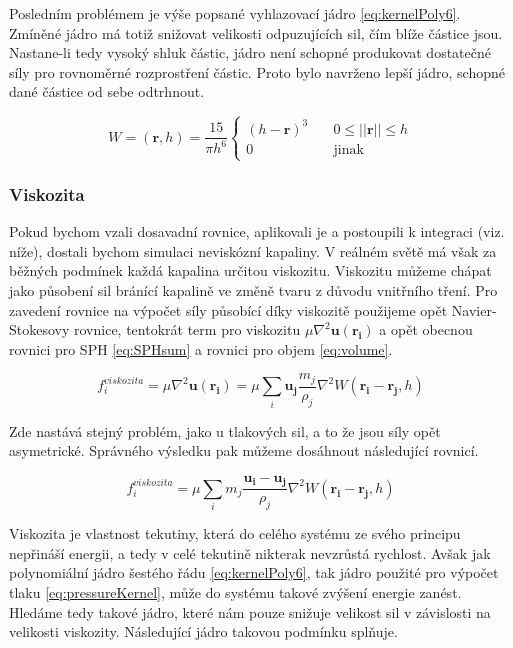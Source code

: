 Posledním problémem je výše popsané vyhlazovací jádro \ref{eq:kernelPoly6}. Zmíněné jádro má totiž snižovat velikosti odpuzujících sil, čím blíže částice jsou. Nastane-li tedy vysoký shluk částic, jádro není schopné produkovat dostatečné síly pro rovnoměrné rozprostření částic. Proto bylo navrženo \cite{Desbrun96} lepší jádro, schopné dané částice od sebe odtrhnout.

\begin{equation}
    W = (\mathbf{r}, h) = \frac{15}{\pi h^6} 
    \begin{cases}
      (h - \mathbf{r})^3 & \quad 0 \leq ||\mathbf{r}|| \leq h \\
      0 & \quad \text{jinak}
    \end{cases}
    \label{eq:pressureKernel}
\end{equation}
    
\subsubsection{Viskozita}
Pokud bychom vzali dosavadní rovnice, aplikovali je a postoupili k integraci (viz. níže), dostali bychom simulaci neviskózní kapaliny. V reálném světě má však za běžných podmínek každá kapalina určitou viskozitu. Viskozitu můžeme chápat jako působení sil bránící kapalině ve změně tvaru z důvodu vnitřního tření. Pro zavedení rovnice na výpočet síly působící díky viskozitě použijeme opět Navier-Stokesovy rovnice, tentokrát term pro viskozitu $\mu \nabla^2\mathbf{u}(\mathbf{r_i})$ a opět obecnou rovnici pro SPH \ref{eq:SPHsum} a rovnici pro objem \ref{eq:volume}.

\begin{equation}
    f^{viskozita}_i = \mu \nabla^2\mathbf{u}(\mathbf{r_i}) = \mu \sum_i \mathbf{u_j} \frac{m_j}{\rho_j} \nabla^2 W(\mathbf{r_i} - \mathbf{r_j},h)
\end{equation}

Zde nastává stejný problém, jako u tlakových sil, a to že jsou síly opět asymetrické. Správného výsledku pak můžeme dosáhnout následující rovnicí. \cite{Muller03}

\begin{equation}
    f^{viskozita}_i = \mu \sum_i m_j \frac{\mathbf{u_i} - \mathbf{u_j}}{\rho_j} \nabla^2 W(\mathbf{r_i} - \mathbf{r_j},h)
    \label{eq:ViscForce}
\end{equation}

Viskozita je vlastnost tekutiny, která do celého systému ze svého principu nepřináší energii, a tedy v celé tekutině nikterak nevzrůstá rychlost. Avšak jak polynomiální jádro šestého řádu \ref{eq:kernelPoly6}, tak jádro použité pro výpočet tlaku \ref{eq:pressureKernel}, může do systému takové zvýšení energie zanést. Hledáme tedy takové jádro, které nám pouze snižuje velikost sil v závislosti na velikosti viskozity. Následující jádro takovou podmínku splňuje. \cite{Muller03}

